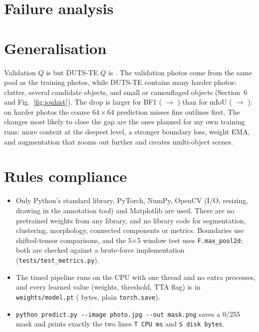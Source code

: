 \documentclass[11pt,a4paper]{article}
\begin{document}
\section{Failure analysis}


\section{Generalisation}
Validation $Q$ is \ValQ{} but DUTS-TE $Q$ is \TeQ. The validation photos come from the same pool as the training
photos, while DUTS-TE contains many harder photos: clutter, several candidate objects, and small or camouflaged
objects (Section~6 and Fig.~\ref{fig:iouhist}).
The drop is larger for BF1 (\ValBFone{} $\to$ \TeBFone) than for mIoU (\ValMiou{} $\to$ \TeMiou): on harder photos
the coarse $64\times64$ prediction misses fine outlines first. The changes most likely to close the gap are the
ones planned for my own training runs: more context at the deepest level, a stronger boundary loss, weight EMA,
and augmentation that zooms out further and creates multi-object scenes.

\section{Rules compliance}
\begin{itemize}
  \item Only Python's standard library, PyTorch, NumPy, OpenCV (I/O, resizing, drawing in the annotation tool) and
        Matplotlib are used. There are no pretrained weights from any library, and no library code for segmentation,
        clustering, morphology, connected components or metrics. Boundaries use shifted-tensor comparisons, and the
        5$\times$5 window test uses \texttt{F.max\_pool2d}; both are checked against a brute-force implementation
        (\texttt{tests/test\_metrics.py}).
  \item The timed pipeline runs on the CPU with one thread and no extra processes, and every learned value
        (weights, threshold, TTA flag) is in \texttt{weights/model.pt} (\SdiskBytes{} bytes, plain \texttt{torch.save}).
  \item \texttt{python predict.py -{}-image photo.jpg -{}-out mask.png} saves a 0/255 mask and prints exactly the two
        lines \texttt{T CPU ms} and \texttt{S disk bytes}.
\end{itemize}
\end{document}
